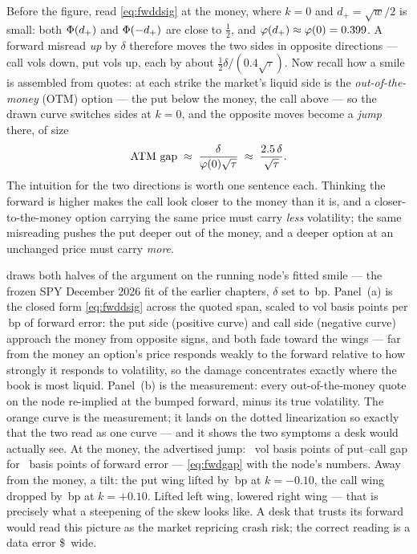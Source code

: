 Before the figure, read \eqref{eq:fwddsig} at the money, where
$k=0$ and $d_+=\sqrt w/2$ is small: both $\Phi(d_+)$ and
$\Phi(-d_+)$ are close to $\tfrac12$, and
$\varphi(d_+)\approx\varphi(0)=0.399$.  A forward misread \emph{up} by
$\delta$ therefore moves the two sides in opposite directions ---
call vols down, put vols up, each by about
$\tfrac12\delta/(0.4\sqrt\tau)$.  Now recall how a smile is
assembled from quotes: at each strike the market's liquid side is the
\emph{out-of-the-money} (OTM) option --- the put below the money, the
call above --- so the drawn curve switches sides at $k=0$, and the
opposite moves become a \emph{jump} there, of size
\begin{equation}
\text{ATM gap}
\;\approx\;\frac{\delta}{\varphi(0)\sqrt\tau}
\;\approx\;\frac{2.5\,\delta}{\sqrt\tau} .
\label{eq:fwdgap}
\end{equation}
The intuition for the two directions is worth one sentence each.
Thinking the forward is higher makes the call look closer to the
money than it is, and a closer-to-the-money option carrying the same
price must carry \emph{less} volatility; the same misreading pushes
the put deeper out of the money, and a deeper option at an unchanged
price must carry \emph{more}.

 draws both halves of the argument on the running
node's fitted smile --- the frozen SPY December 2026 fit of the
earlier chapters, $\delta$ set to \MacFwdSkewBumpBp\,bp.  Panel~(a)
is the closed form \eqref{eq:fwddsig} across the quoted span, scaled
to vol basis points per \MacFwdSkewBumpBp\,bp of forward error: the
put side (positive curve) and call side (negative curve) approach the
money from opposite signs, and both fade toward the wings --- far
from the money an option's price responds weakly to the forward
relative to how strongly it responds to volatility, so the damage
concentrates exactly where the book is most liquid.  Panel~(b) is the
measurement: every out-of-the-money quote on the node re-implied at
the bumped forward, minus its true volatility.  The orange curve is
the measurement; it lands on the dotted linearization so exactly
that the two read as one curve --- and it shows the two symptoms a
desk would actually see.  At the money, the advertised jump:
\MacFwdSkewGapBp\ vol basis points of put--call gap for
\MacFwdSkewBumpBp\ basis points of forward error ---
\eqref{eq:fwdgap} with the node's numbers.  Away from the money, a tilt: the put wing lifted by
\MacFwdSkewPutTenBp\,bp at $k=-0.10$, the call wing dropped by
\MacFwdSkewCallTenBp\,bp at $k=+0.10$.  Lifted left wing, lowered
right wing --- that is precisely what a steepening of the skew looks
like.  A desk that trusts its forward would read this picture as the
market repricing crash risk; the correct reading is a data error
\$\MacFwdLineGapDollars\ wide.

